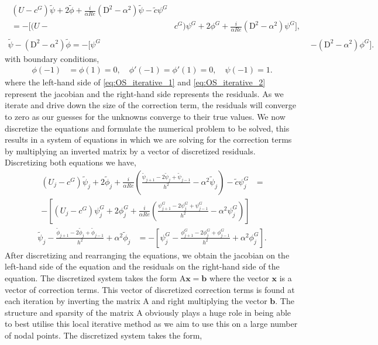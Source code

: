 \documentclass[a4paper, 12pt, twoside, openright]{article}
\numberwithin{equation}{section}
\begin{document}
\begin{align}
\begin{split}
\left(U - c^{G}\right)\tilde \psi + 2\tilde \phi + \frac{i}{\alpha Re}\left(\mathrm{D}^2-\alpha^2\right)\tilde \psi - \tilde c \psi^{G} \\= - \Biggl[(U-&c^{G})\psi^{G} + 2\phi^{G} + \frac{i}{\alpha Re}\left(\mathrm{D}^2-\alpha^2\right)\psi^{G} \Biggr], 
\end{split}\label{eq:OS_iterative_1}\\
\tilde \psi - (\mathrm{D}^2 - \alpha^2)\tilde \phi = - \bigl[ \psi^{G} &- (\mathrm{D}^2 - \alpha^2)\phi^{G} \bigr].\label{eq:OS_iterative_2}
\end{align}
with boundary conditions, 
\begin{align}
\phi(-1)&=\phi(1) = 0, \quad \phi'(-1)=\phi'(1) = 0, \quad \psi(-1)=1.
\end{align}
where the left-hand side of \eqref{eq:OS_iterative_1} and \eqref{eq:OS_iterative_2} represent the jacobian and the right-hand side represents the residuals. As we iterate and drive down the size of the correction term, the residuals will converge to zero as our guesses for the unknowns converge to their true values. We now discretize the equations and formulate the numerical problem to be solved, this results in a system of equations in which we are solving for the correction terms by multiplying an inverted matrix by a vector of discretized residuals. Discretizing both equations we have,
\[
\begin{split}
(U_j - c^{G})\tilde \psi_j + 2\tilde \phi_j + \frac{i}{\alpha Re}\left(\frac{\tilde \psi_{j+1} - 2\tilde \psi_j + \tilde \psi_{j-1}}{h^2} - \alpha^2 \tilde \psi_j \right) - \tilde c\psi^{G}_j &=\\
-\left[ (U_j - c^{G})\psi^{G}_j + 2\phi^{G}_j + \frac{i}{\alpha Re}\left(\frac{ \psi^{G}_{j+1} - 2\psi^{G}_j + \psi^{G}_{j-1}}{h^2} - \alpha^2 \psi^{G}_j \right)  \right]
\end{split}
\]
\begin{align}
\tilde \psi_j - \frac{\tilde \phi_{j+1} - 2\tilde \phi_j + \tilde \phi_{j-1}}{h^2}+\alpha^2\tilde \phi_j &= - \left[ \psi^{G}_j - \frac{\phi^{G}_{j+1} - 2\phi^{G}_j + \phi^{G}_{j-1}}{h^2}+\alpha^2 \phi^{G}_j \right].
\end{align}
After discretizing and rearranging the equations, we obtain the jacobian on the left-hand side of the equation and the residuals on the right-hand side of the equation. The discretized system takes the form $\mathrm{A}\mathbf{x} = \mathbf{b}$ where the vector $\mathbf{x}$ is a vector of correction terms. This vector of discretized correction terms is found at each iteration by inverting the matrix $\mathrm{A}$ and right multiplying the vector $\mathbf{b}$. The structure and sparsity of the matrix $\mathrm{A}$ obviously plays a huge role in being able to best utilise this local iterative method as we aim to use this on a large number of nodal points. The discretized system takes the form,
\end{document}
